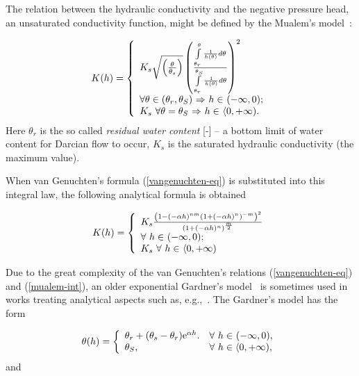 \documentclass[final,3p,times,twocolumn]{elsarticle}
\begin{document}
The relation between the hydraulic conductivity and the negative pressure head, an 
unsaturated conductivity function, might be defined by the Mualem's model~\cite{mualem}:

  \begin{equation}
  \label{mualem-int}
  K(h) = \left\{
    \begin{array}{l l}
     K_s \sqrt{ \left( \frac{\theta}{\theta_s} \right)} \left( \frac{\int\limits_{\theta_r}^{\theta} \frac{1}{h(\theta)}d \theta }{\int\limits_{\theta_r}^{\theta_S} \frac{1}{h(\theta)} d \theta} \right)^2  \\
    \mbox{$\forall \theta \in (\theta_r, \theta_S )$ $\Rightarrow$ $h \in$ $(-\infty,0)$}; \\
    K_s \ \mbox{$\forall \theta= \theta_S $  $\Rightarrow$  $h \in$ $\langle 0, +\infty)$}.\\
    \end{array} \right.
    \end{equation}
Here $\theta_r$ is the so called {\em residual water content} [-] -- a bottom 
limit of water content for Darcian flow to occur, $K_s$ is the saturated 
hydraulic conductivity (the maximum value).


When van Genuchten's formula (\ref{vangenuchten-eq}) is substituted into this integral 
law, the following analytical formula is obtained

  \begin{equation}
  \label{mualem-anal}
  K(h) = \left\{
    \begin{array}{l l}
    K_s \frac{\left( 1- (-\alpha h)^{nm} \left( 1+ (-\alpha h)^n \right)^{-m} \right)^2}{\left(1+(-\alpha h)^n \right)^{\frac{m}{2}}} \\
    \mbox{$\forall$ $h \in$ $(-\infty,0)$};\\
    K_s  \ \mbox{$\forall$ $h \in$ $\langle 0, +\infty)$}\\
    \end{array} \right.
    \end{equation}

Due to the great complexity of the van Genuchten's relations (\ref{vangenuchten-eq}) 
and (\ref{mualem-int}), an older exponential Gardner's model~\cite{gardner} 
is sometimes used in works treating analytical aspects such as, e.g.,~\cite{tracy1,tracy2}. 
The Gardner's model has the form

\begin{equation}
\label{gardner-theta}
\theta (h) = \left\{ 
\begin{array}{l l}
 \theta_r + (\theta_s -\theta_r)\textrm{e}^{\alpha h}. & \mbox{$\forall$  $h \in$ $(-\infty,0)$},\\
  \theta_S, & \mbox{$\forall$ $h \in \langle 0, + \infty )$},
\end{array} \right.
\end{equation}
and 
\end{document}
